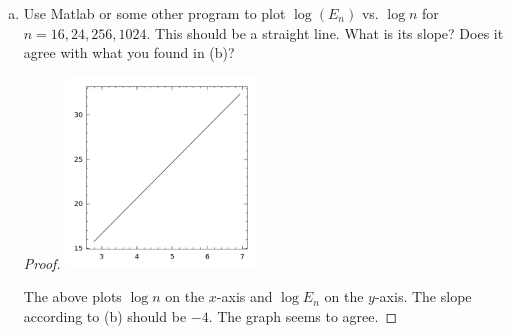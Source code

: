 \documentclass{article}
\begin{document}
\begin{enumerate}[(a)]
\begin{proof}
On the midterm we calculated the Fourier expansion for $f$, so I will assume the hint without proof. Thus
\begin{align*}
E_n & = | \frac {16 \pi^5}{15} - Q_n(\frac{8\pi^4}{15} - \frac{24}{\pi} \sum_{k \ge 0 } e^{ikx} k^{-4}) |
\\ & =  | \frac C n \sum_{j=0}^{n-1} \sum_{k \ge 0} e^{2\pi ikj/n} k^{-4}) |
\\ & = | \frac C n \sum_{k \ge 0} k^{-4} \sum_{j=0}^{n-1} e^{2\pi ikj/n} |
\\ & = C' \sum_{k \ge 0} k^{-4} Q_n(e^{ikx})
\\ & = C' \sum_{k \ge 0} 2 \pi (nk)^{-4}
\\ & = C'' n^{-4}
\end{align*}
where the interchange of summation is justified by the absolute summability of the series.
\end{proof}

\item Use Matlab or some other program to plot $\log(E_n)$ vs. $\log n$ for $n = 16, 24, 256, 1024$. This should be a straight line. What is its slope? Does it agree with what you found in (b)?

\begin{proof}


\includegraphics[width=2in]{lognVlogE.png}

The above plots $\log n$ on the $x$-axis and $\log E_n$ on the $y$-axis. The slope according to (b) should be $-4$. The graph seems to agree.
\end{proof}

\end{enumerate}
\end{document}

